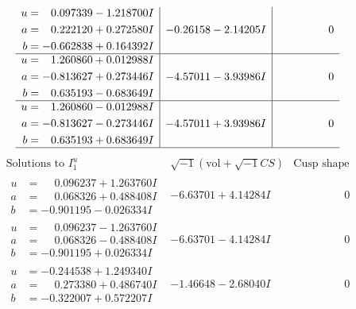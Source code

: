 \documentclass[1p]{elsarticle_modified}
\theoremstyle{definition}
\newcommand{\I}{\sqrt{-1}}
\begin{document}
$$\begin{array}{c|c|c}
\begin{aligned}
u &= \phantom{-}0.097339 - 1.218700 I \\
a &= \phantom{-}0.222120 + 0.272580 I \\
b &= -0.662838 + 0.164392 I\end{aligned}
 & -0.26158 - 2.14205 I & \phantom{-0.000000 } 0 \\ \hline\begin{aligned}
u &= \phantom{-}1.260860 + 0.012988 I \\
a &= -0.813627 + 0.273446 I \\
b &= \phantom{-}0.635193 - 0.683649 I\end{aligned}
 & -4.57011 - 3.93986 I & \phantom{-0.000000 } 0 \\ \hline\begin{aligned}
u &= \phantom{-}1.260860 - 0.012988 I \\
a &= -0.813627 - 0.273446 I \\
b &= \phantom{-}0.635193 + 0.683649 I\end{aligned}
 & -4.57011 + 3.93986 I & \phantom{-0.000000 } 0\\
 \hline 
 \end{array}$$\newpage$$\begin{array}{c|c|c}  
\text{Solutions to }I^u_{1}& \I (\text{vol} + \sqrt{-1}CS) & \text{Cusp shape}\\
 \hline 
\begin{aligned}
u &= \phantom{-}0.096237 + 1.263760 I \\
a &= \phantom{-}0.068326 + 0.488408 I \\
b &= -0.901195 - 0.026334 I\end{aligned}
 & -6.63701 + 4.14284 I & \phantom{-0.000000 } 0 \\ \hline\begin{aligned}
u &= \phantom{-}0.096237 - 1.263760 I \\
a &= \phantom{-}0.068326 - 0.488408 I \\
b &= -0.901195 + 0.026334 I\end{aligned}
 & -6.63701 - 4.14284 I & \phantom{-0.000000 } 0 \\ \hline\begin{aligned}
u &= -0.244538 + 1.249340 I \\
a &= \phantom{-}0.273380 + 0.486740 I \\
b &= -0.322007 + 0.572207 I\end{aligned}
 & -1.46648 - 2.68040 I & \phantom{-0.000000 } 0 \\ \hline\begin{aligned}

\end{aligned}
\end{array}$$
\end{document}
